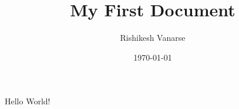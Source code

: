\documentclass[a4paper, 12pt]{article}
\begin{document}
\title{My First Document}
\author{Rishikesh Vanarse}
\date{\today}
\maketitle

Hello World!
\end{document}
